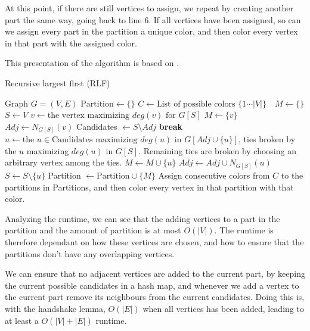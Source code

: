 \documentclass[a4paper]{article}
\newcommand{\algorithmicbreak}{\textbf{break}}
\newcommand{\BREAK}{\STATE \algorithmicbreak}
\begin{document}
At this point, if there are still vertices to assign, we repeat by creating
another part the same way, going back to line 6. If all vertices have been assigned, so can we assign every part in
the partition a unique color, and then color every vertex in that part with the
assigned color.

This presentation of the algorithm is based on \cite{Constructive}.
\begin{algorithm}[H]
  \caption{Recursive largest first (RLF)}
  \label{alg:rlf}
  \begin{algorithmic}[1]
      \REQUIRE Graph $G = (V,E)$
      \STATE $\text{Partition} \leftarrow \{\}$
      \STATE $C \leftarrow \text{List of possible colors $\{1 \cdots |V| \}$ }$
      \STATE $M \leftarrow \{\}$
      \STATE $S \leftarrow V$
        \STATE $v \leftarrow \text{the vertex maximizing $deg(v)$ for $G[S]$} $
        \STATE $M \leftarrow \{v\}$
        \STATE $Adj \leftarrow N_{G[S]}(v)$
            \STATE Candidates $\leftarrow S \setminus Adj$
                \BREAK
            \ENDIF
            \STATE $u \leftarrow \text{the $u \in \text{Candidates}$ maximizing $deg(u)$ in $G[Adj \cup \{u\}]$}$, ties broken by 
            the $u$ maximizing $deg(u)$ in $G[S]$. Remaining ties are broken by
            choosing an arbitrary vertex among the ties.
            \STATE $M \leftarrow M \cup \{u\}$
            \STATE $Adj \leftarrow Adj \cup N_{G[S]}(u)$
            \STATE $S \leftarrow S \setminus \{u\}$
        \ENDWHILE
        \STATE Partition $\leftarrow \text{Partition} \cup \{M\}$ 
      \ENDWHILE
      \STATE Assign consecutive colors from $C$ to the partitions in Partitions,
      and then color every vertex in that partition with that color.
  \end{algorithmic}
\end{algorithm}

Analyzing the runtime, we can see that the adding vertices to a
part in the partition and the amount of partition is at most $O(|V|)$. The
runtime is therefore dependant on how these vertices are chosen, and how to
ensure that the partitions don't have any overlapping vertices. 

We can ensure
that no adjacent vertices are added to the current part, by keeping the current
possible candidates in a hash map, and whenever we add a vertex to the current
part remove its neighbours from the current candidates. Doing this is, with the
handshake lemma, $O(|E|)$ when all vertices has been added, leading to at least
a $O(|V|+|E|)$ runtime.  
\end{document}
